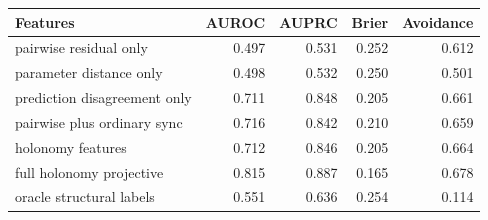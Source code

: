 \begin{tabular}{lrrrr}
\toprule
Features & AUROC & AUPRC & Brier & Avoidance\\
\midrule
pairwise residual only & 0.497 & 0.531 & 0.252 & 0.612\\
parameter distance only & 0.498 & 0.532 & 0.250 & 0.501\\
prediction disagreement only & 0.711 & 0.848 & 0.205 & 0.661\\
pairwise plus ordinary sync & 0.716 & 0.842 & 0.210 & 0.659\\
holonomy features & 0.712 & 0.846 & 0.205 & 0.664\\
full holonomy projective & 0.815 & 0.887 & 0.165 & 0.678\\
oracle structural labels & 0.551 & 0.636 & 0.254 & 0.114\\
\bottomrule
\end{tabular}
